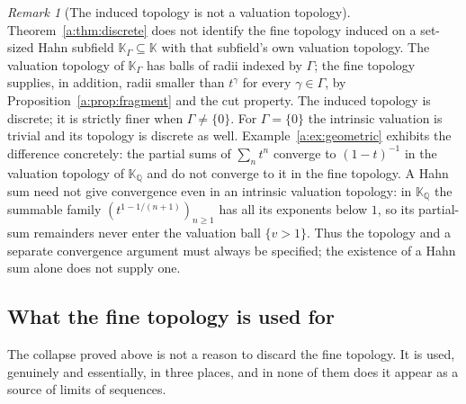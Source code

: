 \documentclass[11pt,a4paper]{article}
\numberwithin{equation}{section}
\theoremstyle{definition}
\theoremstyle{remark}
\newtheorem{remark}[theorem]{Remark}
\theoremstyle{plain}
\newcommand{\K}{\mathbb K}
\newcommand{\tm}{t}
\begin{document}
\begin{remark}[The induced topology is not a valuation
topology]\label{a:rem:notvaluation}
Theorem~\ref{a:thm:discrete} does not identify the fine topology induced
on a set-sized Hahn subfield $\K_\Gamma\subseteq\K$ with that subfield's
own valuation topology.  The valuation topology of $\K_\Gamma$ has balls
of radii indexed by $\Gamma$; the fine topology supplies, in addition,
radii smaller than $\tm^{\gamma}$ for every $\gamma\in\Gamma$, by
Proposition~\ref{a:prop:fragment} and the cut property.  The induced
topology is discrete; it is strictly finer when $\Gamma\ne\{0\}$.
For $\Gamma=\{0\}$ the intrinsic valuation is trivial and its topology
is discrete as well.
Example~\ref{a:ex:geometric} exhibits the difference concretely: the
partial sums of $\sum_n\tm^{n}$ converge to $(1-\tm)^{-1}$ in the
valuation topology of $\K_{\mathbb Q}$ and do not converge to it in the fine
topology.  A Hahn sum need not give convergence even in an intrinsic valuation
topology: in $\K_{\mathbb Q}$ the summable family
$(\tm^{1-1/(n+1)})_{n\ge1}$ has all its exponents below $1$, so its
partial-sum remainders never enter the valuation ball $\{v>1\}$.
Thus the topology and a separate convergence argument must always be
specified; the existence of a Hahn sum alone does not supply one.
\end{remark}

\subsection{What the fine topology is used for}\label{a:rem:fineuse}

The collapse proved above is not a reason to discard the fine topology.
It is used, genuinely and essentially, in three places, and in none of
them does it appear as a source of limits of sequences.
\end{document}
